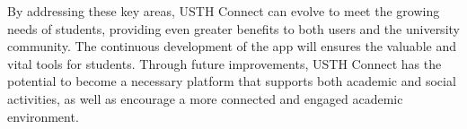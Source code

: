 \documentclass[12pt]{article}
\begin{document}
By addressing these key areas, USTH Connect can evolve to meet the growing needs of students, providing even greater benefits to both users and the university community. The continuous development of the app will ensures the valuable and vital tools for students.
Through future improvements, USTH Connect has the potential to become a necessary platform that supports both academic and social activities, as well as encourage a more connected and engaged academic environment.

\pagebreak
\renewcommand{\bibname}{REFERENCES} 
\begingroup
 
 
\endgroup
\end{document}
